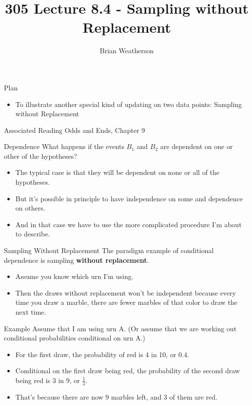 \documentclass[
  ignorenonframetext,
]{beamer}
\title{305 Lecture 8.4 - Sampling without Replacement}
\author{Brian Weatherson}
\date{}
\providecommand{\tightlist}{%
  \setlength{\itemsep}{0pt}\setlength{\parskip}{0pt}}
\renewcommand{\,}{\text{, }}
\begin{document}
\frame{\titlepage}

\begin{frame}{Plan}
\protect\hypertarget{plan}{}
\begin{itemize}
\tightlist
\item
  To illustrate another special kind of updating on two data points:
  Sampling without Replacement
\end{itemize}
\end{frame}

\begin{frame}{Associated Reading}
\protect\hypertarget{associated-reading}{}
Odds and Ends, Chapter 9
\end{frame}

\begin{frame}{Dependence}
\protect\hypertarget{dependence}{}
What happens if the events \(B_1\) and \(B_2\) are dependent on one or
other of the hypotheses?

\begin{itemize}
\tightlist
\item
  The typical case is that they will be dependent on none or all of the
  hypotheses.
\item
  But it's possible in principle to have independence on some and
  dependence on others.
\item
  And in that case we have to use the more complicated procedure I'm
  about to describe.
\end{itemize}
\end{frame}

\begin{frame}{Sampling Without Replacement}
\protect\hypertarget{sampling-without-replacement}{}
The paradigm example of conditional dependence is sampling
\textbf{without replacement}.

\begin{itemize}
\tightlist
\item
  Assume you know which urn I'm using.
\item
  Then the draws without replacement won't be independent because every
  time you draw a marble, there are fewer marbles of that color to draw
  the next time.
\end{itemize}
\end{frame}

\begin{frame}{Example}
\protect\hypertarget{example}{}
Assume that I am using urn A. (Or assume that we are working out
conditional probabilities conditional on urn A.)

\begin{itemize}
\tightlist
\item
  For the first draw, the probability of red is 4 in 10, or 0.4.
\item
  Conditional on the first draw being red, the probability of the second
  draw being red is 3 in 9, or \(\frac{1}{3}\).
\item
  That's because there are now 9 marbles left, and 3 of them are red.
\end{itemize}
\end{frame}
\end{document}
